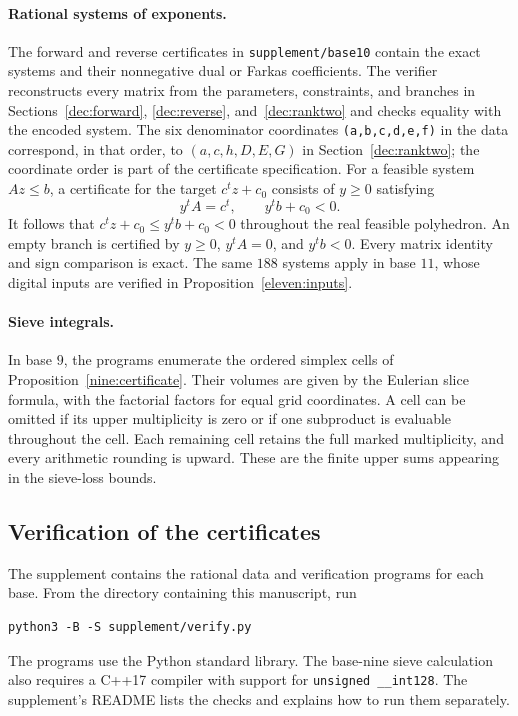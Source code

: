 \documentclass[11pt,a4paper]{article}
\theoremstyle{paperplain}
\numberwithin{equation}{section}
\begin{document}
\paragraph{Rational systems of exponents.}
The forward and reverse certificates in \texttt{supplement/base10}
contain the exact systems and
their nonnegative dual or Farkas coefficients.
The verifier reconstructs every matrix from the parameters, constraints,
and branches in Sections~\ref{dec:forward}, \ref{dec:reverse},
and~\ref{dec:ranktwo} and checks
equality with the encoded system.
The six denominator coordinates \texttt{(a,b,c,d,e,f)} in the data
correspond, in that order, to $(a,c,h,D,E,G)$ in
Section~\ref{dec:ranktwo}; the coordinate order is part of the
certificate specification.
For a feasible system $Az\leqslant b$, a certificate for the target
$c^tz+c_0$ consists of $y\geqslant0$ satisfying
\[
 y^tA=c^t,\qquad y^tb+c_0<0.
\]
It follows that $c^tz+c_0\leqslant y^tb+c_0<0$ throughout the
real feasible polyhedron. An empty branch is certified by
$y\geqslant0$, $y^tA=0$, and $y^tb<0$.
Every matrix identity and sign comparison is exact.
The same $188$ systems apply in base $11$, whose digital inputs are
verified in Proposition~\ref{eleven:inputs}.

\paragraph{Sieve integrals.}
In base $9$, the programs enumerate the ordered simplex cells of
Proposition~\ref{nine:certificate}. Their volumes are given by the
Eulerian slice formula, with the factorial factors for equal grid
coordinates. A cell can be omitted if its upper multiplicity is zero
or if one subproduct is evaluable throughout the cell. Each remaining
cell retains the full marked
multiplicity, and every arithmetic rounding is upward.
These are the finite upper sums appearing in the sieve-loss bounds.

\subsection{Verification of the certificates}

The supplement contains the rational data and verification programs
for each base. From the directory containing this manuscript, run
\begin{verbatim}
python3 -B -S supplement/verify.py
\end{verbatim}
The programs use the Python standard library. The base-nine sieve
calculation also requires a C++17 compiler with support for
\texttt{unsigned \_\_int128}. The supplement's README lists the checks
and explains how to run them separately.
\end{document}
